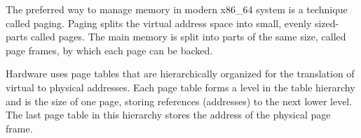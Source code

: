 The preferred way to manage memory in modern x86\_64 system is a technique
called paging. Paging splits the virtual address space into small, evenly
sized-parts called pages. The main memory is split into parts of the same size,
called page frames, by which each page can be backed.

%     
Hardware uses page tables that are hierarchically organized for the translation
of virtual to physical addresses. Each page table forms a level in the table
hierarchy and is the size of one page, storing references (addresses) to the
next lower level. The last page table in this hierarchy stores the address of
the physical page frame.

